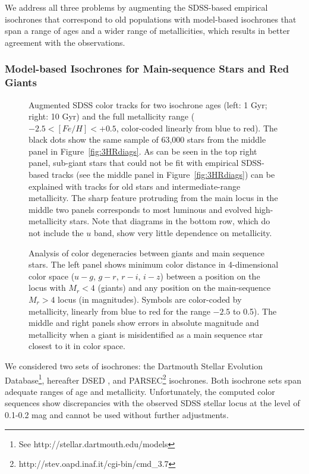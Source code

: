We address all three problems by augmenting the SDSS-based empirical isochrones that correspond to old
populations with model-based isochrones that span a range of ages and a wider range of metallicities, which
results in better agreement with the observations. 
 

\subsubsection{Model-based Isochrones for Main-sequence Stars and Red Giants} 
 

\begin{figure}[ht!]
\caption{Augmented SDSS color tracks for two isochrone ages (left: 1 Gyr; right: 10 Gyr) and the full metallicity range
  ($-2.5 < [Fe/H] < +0.5$, color-coded linearly from blue to red). The black dots show the same sample of 63,000 stars from the middle panel in
  Figure~\ref{fig:3HRdiags}. As can be seen in the top right panel, sub-giant stars that could not be fit with empirical
  SDSS-based tracks (see the middle panel in Figure~\ref{fig:3HRdiags}) can be explained with tracks for old stars and
  intermediate-range metallicity. The sharp feature protruding from the main locus in the middle two panels corresponds
  to most luminous and evolved high-metallicity stars. Note that diagrams in the bottom row, which do not include
  the $u$ band, show very little dependence on metallicity.}  
\label{fig:augmLocus}
\end{figure}

\begin{figure}[ht!]
\caption{Analysis of color degeneracies between giants and main  sequence stars. The left panel shows minimum color distance in
  4-dimensional color space ($u-g$, $g-r$, $r-i$, $i-z$) between a position on the locus with $M_r<4$ (giants) and any position on the
  main-sequence $M_r>4$ locus (in magnitudes). Symbols are color-coded by metallicity, linearly from blue to red for the range $-2.5$ to 0.5).
  The middle and right panels show errors in absolute magnitude and metallicity when a giant is misidentified as a main sequence star
  closest to it in color space.} 
\label{fig:RGdegeneracy}
\end{figure}

We considered two sets of isochrones: the Dartmouth Stellar Evolution Database\footnote{See http://stellar.dartmouth.edu/models},
hereafter DSED \citep{2008ApJS..178...89D}, and PARSEC\footnote{http://stev.oapd.inaf.it/cgi-bin/cmd\_3.7} \citep{2012MNRAS.427..127B} isochrones. 
Both isochrone sets span adequate ranges of age and metallicity. Unfortunately, the computed color sequences show discrepancies
with the observed SDSS stellar locus at the level of 0.1-0.2 mag and cannot be used without further adjustments.

